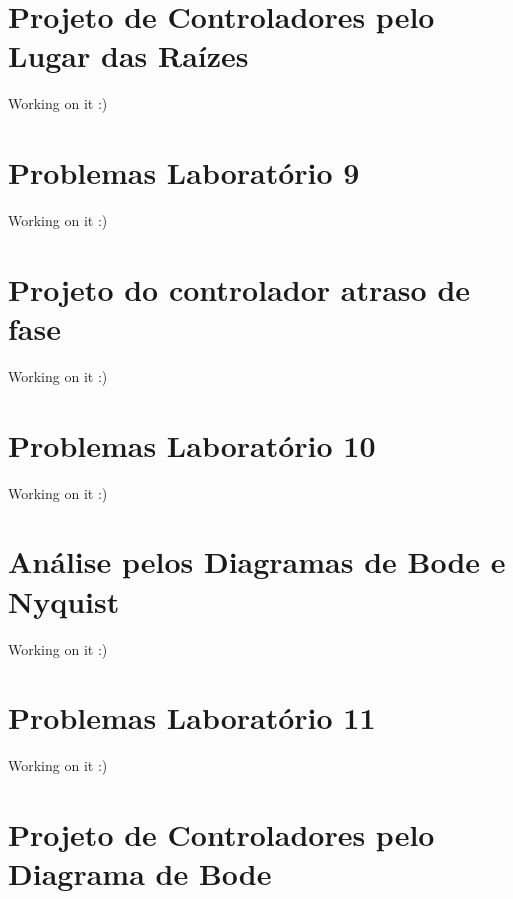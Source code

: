 \documentclass[
]{book}
\theoremstyle{definition}
\theoremstyle{definition}
\theoremstyle{definition}
\theoremstyle{remark}
\begin{document}
\hypertarget{projeto-de-controladores-pelo-lugar-das-rauxedzes}{%
\chapter{Projeto de Controladores pelo Lugar das Raízes}\label{projeto-de-controladores-pelo-lugar-das-rauxedzes}}

Working on it :)

\hypertarget{problemas-laboratuxf3rio-9}{%
\chapter*{Problemas Laboratório 9}\label{problemas-laboratuxf3rio-9}}

Working on it :)

\hypertarget{projeto-do-controlador-atraso-de-fase}{%
\chapter{Projeto do controlador atraso de fase}\label{projeto-do-controlador-atraso-de-fase}}

Working on it :)

\hypertarget{problemas-laboratuxf3rio-10}{%
\chapter*{Problemas Laboratório 10}\label{problemas-laboratuxf3rio-10}}

Working on it :)

\hypertarget{anuxe1lise-pelos-diagramas-de-bode-e-nyquist}{%
\chapter{Análise pelos Diagramas de Bode e Nyquist}\label{anuxe1lise-pelos-diagramas-de-bode-e-nyquist}}

Working on it :)

\hypertarget{problemas-laboratuxf3rio-11}{%
\chapter*{Problemas Laboratório 11}\label{problemas-laboratuxf3rio-11}}

Working on it :)

\hypertarget{projeto-de-controladores-pelo-diagrama-de-bode}{%
\chapter{Projeto de Controladores pelo Diagrama de Bode}\label{projeto-de-controladores-pelo-diagrama-de-bode}}
\end{document}

